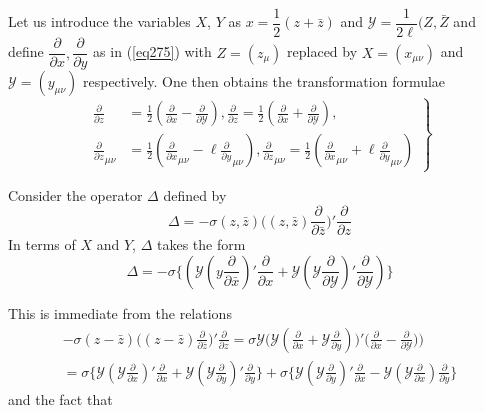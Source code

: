 Let us introduce the variables $X$, $Y$ as $x=\dfrac{1}{2}(z+\bar{z})$
and $\mathcal{Y}=\dfrac{1}{2 \ell }(Z,\bar{Z}$ and define
$\dfrac{\partial}{\partial x},\dfrac{\partial}{\partial y}$ as in
(\ref{eq275}) with $Z=(z_\mu)$ replaced by $X=(x_{\mu \nu})$ and
$\mathcal{Y}=(y_{\mu \nu})$ respectively. One then obtains the
transformation formulae 
\begin{equation*}
\left. \tag{287}\label{eq287}   
\begin{aligned}
\frac{\partial}{\partial z} & =\frac{1}{2}(\frac{\partial}{\partial
  x}-\frac{\partial}{\partial \mathcal{Y}}),\frac{\partial}{\partial
  z}=\frac{1}{2}(\frac{\partial}{\partial x}+\frac{\partial}{\partial
  \mathcal{Y}}),\\ 
\frac{\partial}{\partial z}_{\mu \nu} &
=\frac{1}{2}(\frac{\partial}{\partial x}_{\mu \nu}-\ell
\frac{\partial}{\partial y}_{\mu \nu}), \frac{\partial}{\partial
  z}_{\mu \nu}=\frac{1}{2}(\frac{\partial}{\partial x}_{\mu \nu}+\ell
\frac{\partial}{\partial y}_{\mu \nu}) 
\end{aligned} 
\right \}
\end{equation*}

Consider the operator $\Delta$ defined by  
\begin{equation*}
\Delta = - \sigma (z,\bar{z})\bigg((z,\bar{z})\frac{\partial}{\partial
  \bar{z}}\bigg)' \frac{\partial}{\partial z} \tag{288}\label{eq288}    
\end{equation*}
In terms of $X$ and $Y$, $\Delta$ takes the form 
\begin{equation*}
\Delta = - \sigma \bigg\{(\mathcal{Y}(y \frac{\partial}{\partial
  \bar{x}})' \frac{\partial}{\partial x}
+\mathcal{Y}(\mathcal{Y}\frac{\partial}{\partial
  \mathcal{Y}})'\frac{\partial}{\partial \mathcal{Y}} )\bigg\}
\tag{289}\label{eq289}    
\end{equation*}

This is immediate from the relations
\begin{gather*}
- \sigma (z-\bar{z})\bigg( (z-\bar{z})\frac{\partial}{\partial
  \bar{z}}\bigg)'\frac{\partial}{\partial z}=\sigma
\mathcal{Y}\bigg(\mathcal{Y}(\frac{\partial}{\partial
  x}+\mathcal{Y}\frac{\partial}{\partial
  y})\bigg)'\bigg(\frac{\partial}{\partial x}-
\frac{\partial}{\partial \mathcal{Y}})\bigg) \\ 
= \sigma \bigg\{ \mathcal{Y} (\mathcal{Y} \frac{\partial}{\partial
  x})'\frac{\partial}{\partial x} + \mathcal{Y} (\mathcal{Y}
\frac{\partial}{\partial y})'\frac{\partial}{\partial y}\bigg \} +
\sigma \bigg \{ \mathcal{Y}(\mathcal{Y} \frac{\partial}{\partial
  y})'\frac{\partial}{\partial x}-\mathcal{Y}(\mathcal{Y}
\frac{\partial}{\partial x})\frac{\partial}{\partial y}\bigg \} 
\end{gather*}
and the fact that

